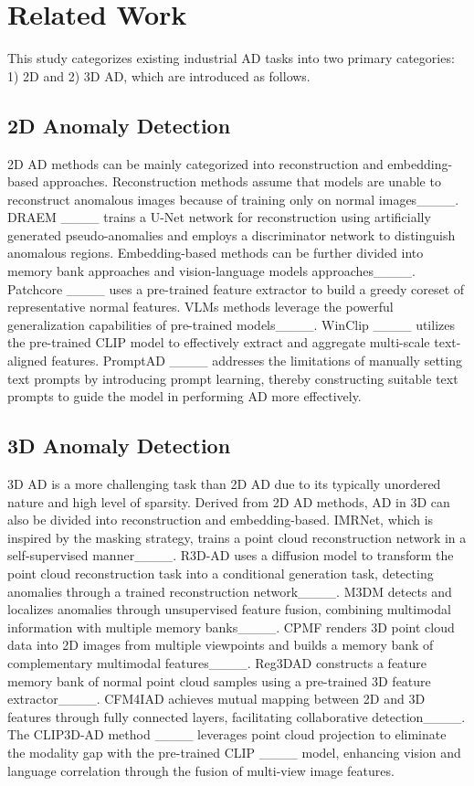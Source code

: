 \section{Related Work}
This study categorizes existing industrial AD tasks into two primary categories: 1) 2D and 2) 3D AD, which are introduced as follows.
\subsection{2D Anomaly Detection} 
2D AD methods can be mainly categorized into reconstruction and embedding-based approaches. Reconstruction methods assume that models are unable to reconstruct anomalous images because of training only on normal images____. DRAEM ____ trains a U-Net network for reconstruction using artificially generated pseudo-anomalies and employs a discriminator network to distinguish anomalous regions. Embedding-based methods can be further divided into memory bank approaches and vision-language models approaches____. Patchcore ____ uses a pre-trained feature extractor to build a greedy coreset of representative normal features. VLMs methods leverage the powerful generalization capabilities of pre-trained models____. WinClip ____ utilizes the pre-trained CLIP model to effectively extract and aggregate multi-scale text-aligned features. PromptAD ____ addresses the limitations of manually setting text prompts by introducing prompt learning, thereby constructing suitable text prompts to guide the model in performing AD more effectively.
\subsection{3D Anomaly Detection} 
3D AD is a more challenging task than 2D AD due to its typically unordered nature and high level of sparsity. Derived from 2D AD methods, AD in 3D can also be divided into reconstruction and embedding-based. IMRNet, which is inspired by the masking strategy, trains a point cloud reconstruction network in a self-supervised manner____.  R3D-AD uses a diffusion model to transform the point cloud reconstruction task into a conditional generation task, detecting anomalies through a trained reconstruction network____. M3DM detects and localizes anomalies through unsupervised feature fusion, combining multimodal information with multiple memory banks____. CPMF renders 3D point cloud data into 2D images from multiple viewpoints and builds a memory bank of complementary multimodal features____. Reg3DAD constructs a feature memory bank of normal point cloud samples using a pre-trained 3D feature extractor____. CFM4IAD achieves mutual mapping between 2D and 3D features through fully connected layers, facilitating collaborative detection____. The CLIP3D-AD method ____ leverages point cloud projection to eliminate the modality gap with the pre-trained CLIP ____ model, enhancing vision and language correlation through the fusion of multi-view image features.